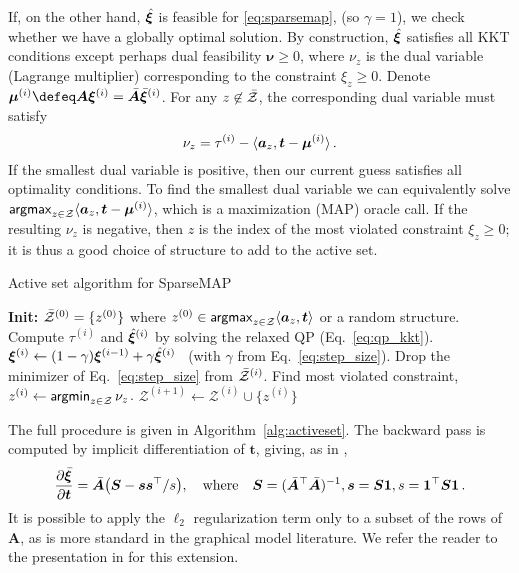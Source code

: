 If, on the other hand, $\hat{\bm{\xi}}$ is feasible for \eqref{eq:sparsemap},
(so $\gamma=1$),
we check whether we have a globally optimal solution.
By construction, $\hat{\bm{\xi}}$ satisfies all KKT
conditions except perhaps dual feasibility $\bm{\nu} \geq 0$,
where $\nu_z$ is the dual variable (Lagrange multiplier) corresponding to the
constraint $\xi_z \geq 0$.
Denote $\bm{\mu}^{(i)} \defeq \bm{A}\pv^{(i)} = \bar{\bm{A}}\bar{\pv}^{(i)}$.
For any $z \not\in \bar{\mathcal{Z}}$, the corresponding dual variable must satisfy
%
\begin{equation}\label{eq:dual}
    \nu_z = \tau^{(i)} - \langle\bm{a}_z,\bm{t} - \bm{\mu}^{(i)}\rangle\,.
\end{equation}
%
If the smallest dual variable is positive, then our current guess satisfies all
optimality conditions. To find the smallest dual variable we can equivalently
solve $\operatorname*{\mathsf{argmax}}_{z \in \mathcal{Z}} \langle\bm{a}_z,\bm{t} - \bm{\mu}^{(i)}\rangle$, which is
a maximization (MAP) oracle call. If the resulting $\nu_z$ is negative,
then $z$ is the index of the most violated constraint $\xi_z \geq 0$;
it is thus a good choice of structure to add to the active set.

\begin{algorithm}[htpb]
    \caption{Active set algorithm for SparseMAP \label{alg:activeset}}
    \begin{algorithmic}[1]
        \Statex \textbf{Init:}
        $\bar{\mathcal{Z}}^{(0)} = \{ z^{(0)}\}$
        \quad where \quad
        $z^{(0)} \in \operatorname*{\mathsf{argmax}}_{z \in \mathcal{Z}} \langle\bm{a}_z,\bm{t}\rangle$
        or a random structure.
        \State Compute $\tau^{(i)}$ and $\hat{\bm{\xi}}^{(i)}$ by solving the relaxed QP (Eq.~\ref{eq:qp_kkt}).
        \State $\bm{\xi}^{(i)} \gets (1-\gamma) \bm{\xi}^{(i-1)} + \gamma \hat{\bm{\xi}}^{(i)}$
        ~(with $\gamma$ from Eq.~\ref{eq:step_size}).
        \State Drop the minimizer of Eq.~\ref{eq:step_size} from $\bar{\mathcal{Z}}^{(i)}$.
        \Else
        \State Find most violated constraint,
        $z^{(i)} \gets \operatorname*{\mathsf{argmin}}_{z \in \mathcal{Z}} \nu_z$.
        \State \Return {}
        \Else
        \State $\mathcal{Z}^{(i+1)} \gets \mathcal{Z}^{(i)} \cup \{ z^{(i)} \}$
        \EndIf
        \EndIf
        \EndFor
    \end{algorithmic}
\end{algorithm}

The full procedure is given in Algorithm~\ref{alg:activeset}.
The backward pass is computed by implicit differentiation of  \wrt
$\bm{t}$, giving, as in \cite{niculae2018sparsemap},
\begin{equation}
    \frac{\partial \bar{\bm{\xi}}}{\partial \bm{t}} = \bar{\bm{A}}\big(\bm{S} - \bm{ss}^\top / s\big),
    \quad\text{where}\quad
    \bm{S} = (\bar{\bm{A}}^\top \bar{\bm{A}})^{-1},
    \bm{s} = \bm{S1}, s = \bm{1}^\top\bm{S1}
    \,.
\end{equation}
It is possible to apply the $\ell_2$ regularization term only to a subset of the
rows of $\bm{A}$, as is more standard in the graphical model literature. We
refer the reader to the presentation in \cite{ad3,niculae2018sparsemap} for this extension.
